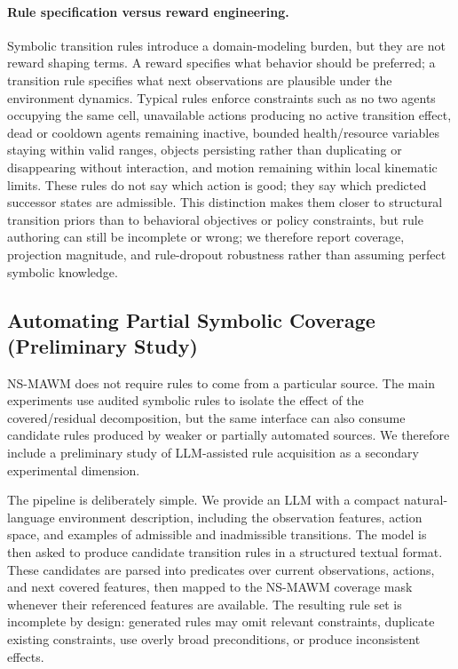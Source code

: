 \documentclass{article}
\theoremstyle{plain}
\theoremstyle{definition}
\theoremstyle{remark}
\begin{document}
\paragraph{Rule specification versus reward engineering.}
Symbolic transition rules introduce a domain-modeling burden, but they are not reward shaping terms. A reward specifies what behavior should be preferred; a transition rule specifies what next observations are plausible under the environment dynamics. Typical rules enforce constraints such as no two agents occupying the same cell, unavailable actions producing no active transition effect, dead or cooldown agents remaining inactive, bounded health/resource variables staying within valid ranges, objects persisting rather than duplicating or disappearing without interaction, and motion remaining within local kinematic limits. These rules do not say which action is good; they say which predicted successor states are admissible. This distinction makes them closer to structural transition priors than to behavioral objectives or policy constraints, but rule authoring can still be incomplete or wrong; we therefore report coverage, projection magnitude, and rule-dropout robustness rather than assuming perfect symbolic knowledge.

\subsection{Automating Partial Symbolic Coverage (Preliminary Study)}
\label{sec:llm_rules}

NS-MAWM does not require rules to come from a particular source. The main experiments use audited symbolic rules to isolate the effect of the covered/residual decomposition, but the same interface can also consume candidate rules produced by weaker or partially automated sources. We therefore include a preliminary study of LLM-assisted rule acquisition as a secondary experimental dimension.

The pipeline is deliberately simple. We provide an LLM with a compact natural-language environment description, including the observation features, action space, and examples of admissible and inadmissible transitions. The model is then asked to produce candidate transition rules in a structured textual format. These candidates are parsed into predicates over current observations, actions, and next covered features, then mapped to the NS-MAWM coverage mask whenever their referenced features are available. The resulting rule set is incomplete by design: generated rules may omit relevant constraints, duplicate existing constraints, use overly broad preconditions, or produce inconsistent effects.
\end{document}
